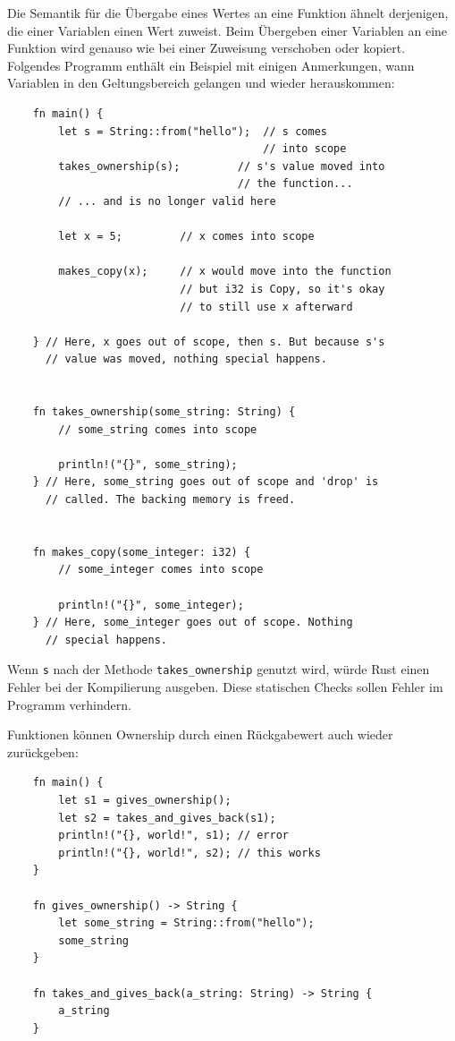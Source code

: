 Die Semantik für die Übergabe eines Wertes an eine Funktion ähnelt derjenigen, die einer Variablen einen Wert zuweist. Beim Übergeben einer Variablen an eine Funktion wird genauso wie bei einer Zuweisung verschoben oder kopiert. Folgendes Programm enthält ein Beispiel mit einigen Anmerkungen, wann Variablen in den Geltungsbereich gelangen und wieder herauskommen:

\begin{lstlisting}
    fn main() {
        let s = String::from("hello");  // s comes
                                        // into scope
        takes_ownership(s);         // s's value moved into
                                    // the function...
        // ... and is no longer valid here

        let x = 5;         // x comes into scope

        makes_copy(x);     // x would move into the function
                           // but i32 is Copy, so it's okay
                           // to still use x afterward

    } // Here, x goes out of scope, then s. But because s's
      // value was moved, nothing special happens.


    fn takes_ownership(some_string: String) {
        // some_string comes into scope

        println!("{}", some_string);
    } // Here, some_string goes out of scope and 'drop' is
      // called. The backing memory is freed.


    fn makes_copy(some_integer: i32) {
        // some_integer comes into scope

        println!("{}", some_integer);
    } // Here, some_integer goes out of scope. Nothing
      // special happens.
\end{lstlisting}

Wenn \verb"s" nach der Methode \verb"takes_ownership" genutzt wird, würde Rust einen Fehler bei der Kompilierung ausgeben. Diese statischen Checks sollen Fehler im Programm verhindern.

Funktionen können Ownership durch einen Rückgabewert auch wieder zu\-rück\-ge\-ben:

\begin{lstlisting}
    fn main() {
        let s1 = gives_ownership();
        let s2 = takes_and_gives_back(s1);
        println!("{}, world!", s1); // error
        println!("{}, world!", s2); // this works
    }

    fn gives_ownership() -> String {
        let some_string = String::from("hello");
        some_string
    }

    fn takes_and_gives_back(a_string: String) -> String {
        a_string
    }
\end{lstlisting}

